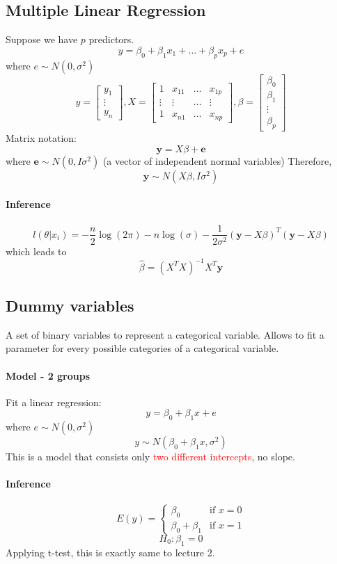 \documentclass[11pt]{article}
\newcommand{\tb}[1]{\textbf{#1}}
\newcommand{\vy}[0]{\tb{y}}
\newcommand{\ve}[0]{\tb{e}}
\begin{document}
\subsection{Multiple Linear Regression}
Suppose we have $p$ predictors.
$$y = \beta_0 + \beta_1x_1 + \hdots + \beta_p x_p + e$$ where $e \sim N(0, \sigma^2)$
$$y = \begin{bmatrix} y_1 \\ \vdots \\ y_n \end{bmatrix},
X = \begin{bmatrix}
	1 & x_{11} & \hdots & x_{1p} \\
	\vdots & \vdots & \hdots & \vdots \\
	1 & x_{n1} & \hdots & x_{np}
\end{bmatrix}, \beta = \begin{bmatrix}
	\beta_0 \\ \beta_1 \\ \vdots \\ \beta_p
\end{bmatrix}$$
Matrix notation:
$$\vy = X\beta + \ve$$ where $\ve \sim N(0, I\sigma^2)$ (a vector of independent normal variables)
Therefore,
$$ \vy \sim N(X\beta, I\sigma^2)$$
\paragraph{Inference}
$$l(\theta|x_i) = -\frac{n}{2} \log(2\pi) - n\log(\sigma) - \frac{1}{2\sigma^2}(\vy - X\beta)^T(\vy - X\beta)$$
which leads to $$\hat{\beta} = (X^TX)^{-1}X^T\vy$$
\subsection{Dummy variables}
A set of binary variables to represent a categorical variable.
Allows to fit a parameter for every possible categories of a categorical variable.
\paragraph{Model - 2 groups}
Fit a linear regression:
$$y = \beta_0 + \beta_1x + e$$ where $e \sim N(0, \sigma^2)$
$$y \sim N(\beta_0 + \beta_1 x, \sigma^2)$$
This is a model that consists only \textcolor{red}{two different intercepts}, no slope.
\paragraph{Inference}
$$E(y) = \begin{cases}
	\beta_0 & \text{if $x = 0$} \\
	\beta_0 + \beta_1 &\text{if $x = 1$}
\end{cases}$$
$$H_0: \beta_1 = 0$$
Applying t-test, this is exactly same to lecture 2.
\end{document}
